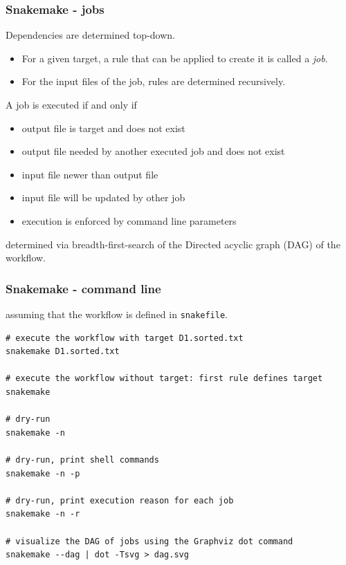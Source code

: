 \documentclass{beamer}
\begin{document}
\begin{frame}[fragile]
\frametitle{Snakemake - jobs }

\alert<1> 

Dependencies are determined top-down.

\bigskip
\begin{itemize}
\item For a given target, a rule that can be applied to create it is called a {\em job}.
\item For the input files of the job, rules are determined recursively.
\end{itemize}

\bigskip
A job is executed if and only if

\begin{itemize}
\item output file is target and does not exist
\item output file needed by another executed job and does not exist
\item input file newer than output file
\item input file will be updated by other job
\item execution is enforced by command line parameters
\end{itemize}

determined via breadth-first-search of the Directed acyclic graph (DAG) of the workflow.

\end{frame}

\begin{frame}[fragile]
\frametitle{Snakemake - command line }

\alert<1> 

assuming that the workflow is defined in {\tt snakefile}.

\begin{tiny}
\begin{verbatim}
# execute the workflow with target D1.sorted.txt
snakemake D1.sorted.txt

# execute the workflow without target: first rule defines target
snakemake

# dry-run
snakemake -n

# dry-run, print shell commands
snakemake -n -p

# dry-run, print execution reason for each job
snakemake -n -r

# visualize the DAG of jobs using the Graphviz dot command
snakemake --dag | dot -Tsvg > dag.svg
\end{verbatim}
\end{tiny}

\end{frame}
\end{document}
